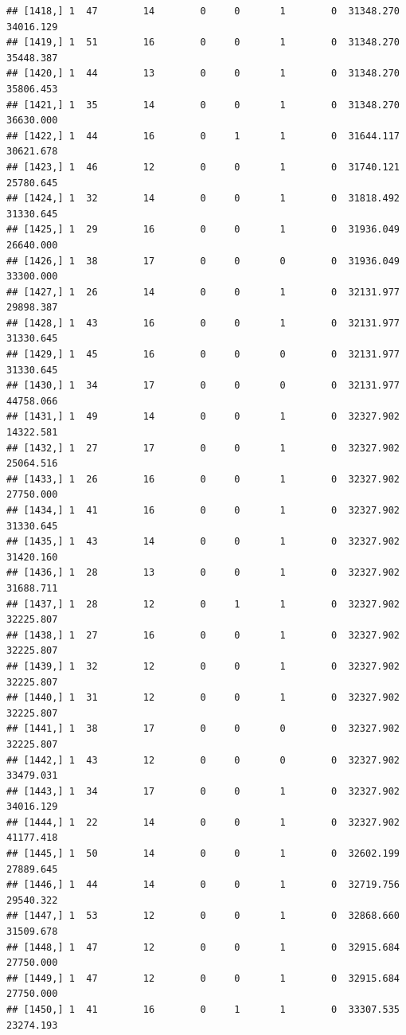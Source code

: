 \documentclass[
]{article}
\begin{document}
\begin{verbatim}
## [1418,] 1  47        14        0     0       1        0  31348.270  34016.129
## [1419,] 1  51        16        0     0       1        0  31348.270  35448.387
## [1420,] 1  44        13        0     0       1        0  31348.270  35806.453
## [1421,] 1  35        14        0     0       1        0  31348.270  36630.000
## [1422,] 1  44        16        0     1       1        0  31644.117  30621.678
## [1423,] 1  46        12        0     0       1        0  31740.121  25780.645
## [1424,] 1  32        14        0     0       1        0  31818.492  31330.645
## [1425,] 1  29        16        0     0       1        0  31936.049  26640.000
## [1426,] 1  38        17        0     0       0        0  31936.049  33300.000
## [1427,] 1  26        14        0     0       1        0  32131.977  29898.387
## [1428,] 1  43        16        0     0       1        0  32131.977  31330.645
## [1429,] 1  45        16        0     0       0        0  32131.977  31330.645
## [1430,] 1  34        17        0     0       0        0  32131.977  44758.066
## [1431,] 1  49        14        0     0       1        0  32327.902  14322.581
## [1432,] 1  27        17        0     0       1        0  32327.902  25064.516
## [1433,] 1  26        16        0     0       1        0  32327.902  27750.000
## [1434,] 1  41        16        0     0       1        0  32327.902  31330.645
## [1435,] 1  43        14        0     0       1        0  32327.902  31420.160
## [1436,] 1  28        13        0     0       1        0  32327.902  31688.711
## [1437,] 1  28        12        0     1       1        0  32327.902  32225.807
## [1438,] 1  27        16        0     0       1        0  32327.902  32225.807
## [1439,] 1  32        12        0     0       1        0  32327.902  32225.807
## [1440,] 1  31        12        0     0       1        0  32327.902  32225.807
## [1441,] 1  38        17        0     0       0        0  32327.902  32225.807
## [1442,] 1  43        12        0     0       0        0  32327.902  33479.031
## [1443,] 1  34        17        0     0       1        0  32327.902  34016.129
## [1444,] 1  22        14        0     0       1        0  32327.902  41177.418
## [1445,] 1  50        14        0     0       1        0  32602.199  27889.645
## [1446,] 1  44        14        0     0       1        0  32719.756  29540.322
## [1447,] 1  53        12        0     0       1        0  32868.660  31509.678
## [1448,] 1  47        12        0     0       1        0  32915.684  27750.000
## [1449,] 1  47        12        0     0       1        0  32915.684  27750.000
## [1450,] 1  41        16        0     1       1        0  33307.535  23274.193

\end{verbatim}
\end{document}
